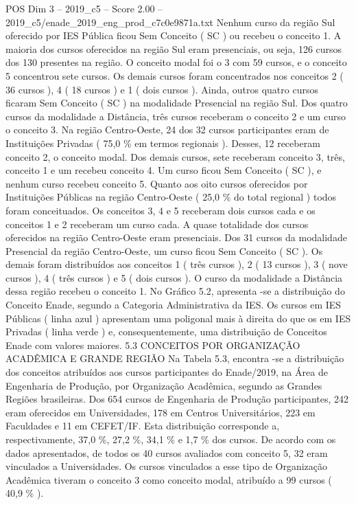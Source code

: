 \begin{textsample}{POS Dim 3 – 2019\_c5 – Score 2.00 – 2019\_c5/enade\_2019\_eng\_prod\_c7c0e9871a.txt}
Nenhum curso da região Sul oferecido por IES Pública ficou Sem Conceito ( SC ) ou recebeu o conceito 1.
A maioria dos cursos oferecidos na região Sul eram presenciais, ou seja, 126 cursos dos 130 presentes na região.
O conceito modal foi o 3 com 59 cursos, e o conceito 5 concentrou sete cursos.
Os demais cursos foram concentrados nos conceitos 2 ( 36 cursos ), 4 ( 18 cursos ) e 1 ( dois cursos ).
Ainda, outros quatro cursos ficaram Sem Conceito ( SC ) na modalidade Presencial na região Sul.
Dos quatro cursos da modalidade a Distância, três cursos receberam o conceito 2 e um curso o conceito 3.
Na região Centro-Oeste, 24 dos 32 cursos participantes eram de Instituições Privadas ( 75,0 \% em termos regionais ).
Desses, 12 receberam conceito 2, o conceito modal.
Dos demais cursos, sete receberam conceito 3, três, conceito 1 e um recebeu conceito 4.
Um curso ficou Sem Conceito ( SC ), e nenhum curso recebeu conceito 5.
Quanto aos oito cursos oferecidos por Instituições Públicas na região Centro-Oeste ( 25,0 \% do total regional ) todos foram conceituados.
Os conceitos 3, 4 e 5 receberam dois cursos cada e os conceitos 1 e 2 receberam um curso cada.
A quase totalidade dos cursos oferecidos na região Centro-Oeste eram presenciais.
Dos 31 cursos da modalidade Presencial da região Centro-Oeste, um curso ficou Sem Conceito ( SC ).
Os demais foram distribuídos aos conceitos 1 ( três cursos ), 2 ( 13 cursos ), 3 ( nove cursos ), 4 ( três cursos ) e 5 ( dois cursos ).
O curso da modalidade a Distância dessa região recebeu o conceito 1.
No Gráfico 5.2, apresenta -se a distribuição do Conceito Enade, segundo a Categoria Administrativa da IES.
Os cursos em IES Públicas ( linha azul ) apresentam uma poligonal mais à direita do que os em IES Privadas ( linha verde ) e, consequentemente, uma distribuição de Conceitos Enade com valores maiores. 5.3 CONCEITOS POR ORGANIZAÇÃO ACADÊMICA E GRANDE REGIÃO Na Tabela 5.3, encontra -se a distribuição dos conceitos atribuídos aos cursos participantes do Enade/2019, na Área de Engenharia de Produção, por Organização Acadêmica, segundo as Grandes Regiões brasileiras.
Dos 654 cursos de Engenharia de Produção participantes, 242 eram oferecidos em Universidades, 178 em Centros Universitários, 223 em Faculdades e 11 em CEFET/IF.
Esta distribuição corresponde a, respectivamente, 37,0 \%, 27,2 \%, 34,1 \% e 1,7 \% dos cursos.
De acordo com os dados apresentados, de todos os 40 cursos avaliados com conceito 5, 32 eram vinculados a Universidades.
Os cursos vinculados a esse tipo de Organização Acadêmica tiveram o conceito 3 como conceito modal, atribuído a 99 cursos ( 40,9 \% ).

\end{textsample}
